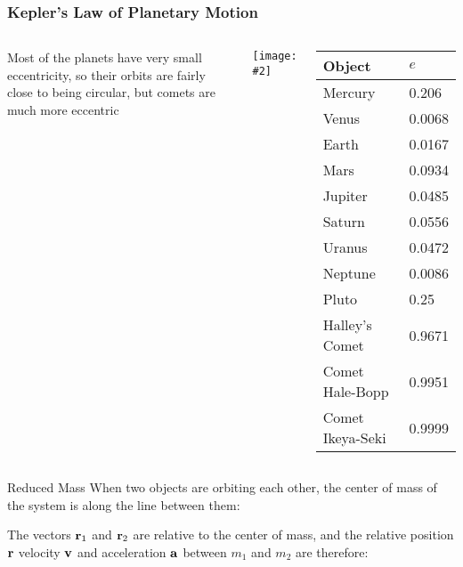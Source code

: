 \documentclass[12pt,compress,aspectratio=169]{beamer}
\newcommand{\pic}[2]{\texttt{[image: \#2]}}
\newcommand{\mb}[1]{\ensuremath\mathbf{#1}}
\newcommand{\eq}[2]{\vspace{#1}{\Large\begin{displaymath}#2\end{displaymath}}}
\begin{document}
\begin{frame}
  \frametitle{Kepler's Law of Planetary Motion}
  \begin{columns}
    Most of the planets have very small eccentricity, so their orbits are
    fairly close to being circular, but comets are much more eccentric
    \begin{center}
      \pic{.7}{kep5.png}
    \end{center}
    
    \begin{tabular}{l|l}
      \rowcolor{pink}
      \textbf{Object} & $e$ \\ \hline
      Mercury	& \num{.206} \\
      Venus	& \num{.0068} \\
      Earth	& \num{.0167} \\
      Mars	& \num{.0934} \\
      Jupiter	& \num{.0485} \\
      Saturn	& \num{.0556} \\
      Uranus	& \num{.0472} \\
      Neptune	& \num{.0086} \\
      Pluto	& \num{.25} \\ \hline
      Halley's Comet   & \num{.9671} \\
      Comet Hale-Bopp  & \num{.9951} \\
      Comet Ikeya-Seki & \num{.9999}
    \end{tabular}
  \end{columns}
\end{frame}

\begin{frame}{Reduced Mass}
  When two objects are orbiting each other, the center of mass of the system is
  along the line between them:
  \begin{center}
  \end{center}

  \vspace{-.1in}The vectors $\mb{r}_1$ and $\mb{r}_2$ are relative to the
  center of mass, and the relative position $\mb{r}$ velocity $\mb{v}$ and
  acceleration $\mb{a}$ between $m_1$ and $m_2$ are therefore:
  
  \eq{-.2in}{
    \mb{r}=\mb{r}_2 - \mb{r}_1\quad
    \mb{v}=\mb{v}_2 - \mb{v}_1\quad
    \mb{a}=\mb{a}_2 - \mb{a}_1
  }
\end{frame}
\end{document}

